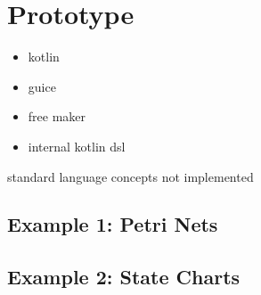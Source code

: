 \chapter{Prototype}

\begin{itemize}
  \item kotlin
  \item guice
  \item free maker
  \item internal kotlin dsl
\end{itemize}


standard language concepts not implemented 

\section{Example 1: Petri Nets}

\section{Example 2: State Charts}
